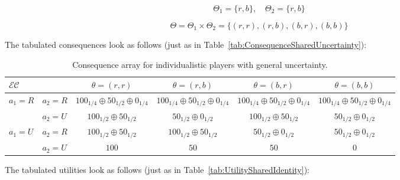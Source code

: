 \documentclass{article}
\theoremstyle{definition}
\begin{document}
\begin{equation}
    \Theta_1 = \{ r, b \}, \quad
    \Theta_2 = \{ r, b \}
\end{equation}

\begin{equation}
    \Theta = \Theta_1 \times \Theta_2 = \{ (r,r), (r,b), (b,r), (b, b) \}
\end{equation}

The tabulated consequences look as follows (just as in Table~\ref{tab:ConsequenceSharedUncertainty}):

\begin{table}[H]
    \label{tab:ConsequenceSharedUncertaintyIndividualistic}
\begin{center}
\begin{tabular}{|l l|c c c c|}
\hline
\multirow{1}{*}{$\mathcal{EC}$} & & $\theta=(r,r)$ & $\theta=(r,b)$ & $\theta=(b,r)$ & $\theta=(b,b)$\\
\hline
\multirow{2}{*}{$a_1=R$}
  & $a_2=R$ &
  $100_{1/4} \oplus 50_{1/2} \oplus 0_{1/4}$ &
  $100_{1/4} \oplus 50_{1/2} \oplus 0_{1/4}$ &
  $100_{1/4} \oplus 50_{1/2} \oplus 0_{1/4}$ &
  $100_{1/4} \oplus 50_{1/2} \oplus 0_{1/4}$\\
\cline{2-6}
  & $a_2=U$ &
  $100_{1/2} \oplus 50_{1/2}$ &
  $50_{1/2} \oplus 0_{1/2}$ &
  $100_{1/2} \oplus 50_{1/2}$ &
  $50_{1/2} \oplus 0_{1/2}$\\
\hline
\multirow{2}{*}{$a_1=U$}
  & $a_2=R$ &
  $100_{1/2} \oplus 50_{1/2}$ &
  $100_{1/2} \oplus 50_{1/2}$ &
  $50_{1/2} \oplus 0_{1/2}$ &
  $50_{1/2} \oplus 0_{1/2}$\\
\cline{2-6}
  & $a_2=U$ &
  $100$ & $50$ & $50$ & $0$\\
\hline
\end{tabular}
\caption{Consequence array for individualistic players with general uncertainty.}
\end{center}
\end{table}

The tabulated utilities look as follows (just as in Table~\ref{tab:UtilitySharedIdentity}):
\end{document}
